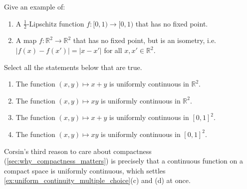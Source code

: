 

\begin{exercise}
\label{ex:lipschitz_or_not}
Give an example of:
\begin{enumerate}[label=\textbf{(\alph*)}]
  \item A $\tfrac{1}{2}$-Lipschitz function $f : [0,1) \to [0,1)$ that has no fixed point.
  \item A map $f : \mathbb{R}^2 \to \mathbb{R}^2$ that has no fixed point, but is an isometry,
    i.e.\ $|f(x) - f(x')| = |x - x'|$ for all $x, x' \in \mathbb{R}^2$.
\end{enumerate}
\end{exercise}


\begin{exercise}
\label{ex:uniform_continuity_multiple_choice}
Select all the statements below that are true.
\begin{enumerate}[label=\textbf{(\alph*)}]
  \item The function $(x,y) \mapsto x+y$ is uniformly continuous in $\mathbb{R}^2$.
  \item The function $(x,y) \mapsto xy$ is uniformly continuous in $\mathbb{R}^2$.
  \item The function $(x,y) \mapsto x+y$ is uniformly continuous in $[0,1]^2$.
  \item The function $(x,y) \mapsto xy$ is uniformly continuous in $[0,1]^2$.
\end{enumerate}
\end{exercise}

\begin{remark}
Corsin's third reason to care about compactness (\cref{sec:why_compactness_matters}) is precisely
that a continuous function on a compact space is uniformly continuous, which settles
\cref{ex:uniform_continuity_multiple_choice}(c) and (d) at once.
\end{remark}

